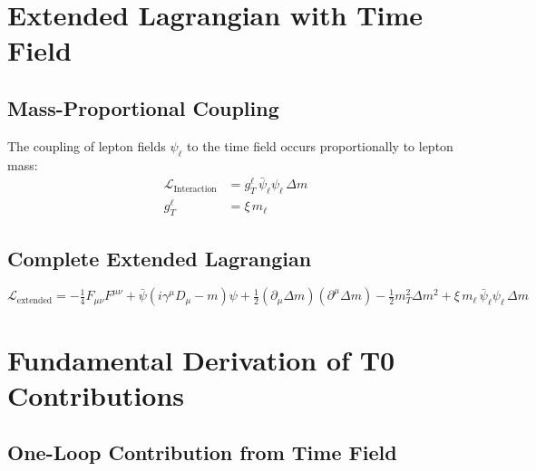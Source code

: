 \documentclass[12pt,a4paper]{article}
\begin{document}
	\section{Extended Lagrangian with Time Field}
	
	\subsection{Mass-Proportional Coupling}
	
	The coupling of lepton fields $\psi_\ell$ to the time field occurs proportionally to lepton mass:
	\begin{align}
		\mathcal{L}_{\mathrm{Interaction}} &= g_T^\ell \, \bar{\psi}_\ell \psi_\ell \, \Delta m \label{eq:interaction_lagrangian}\\
		g_T^\ell &= \xi \, m_\ell \label{eq:coupling_strength}
	\end{align}
	
	\subsection{Complete Extended Lagrangian}
	
	\begin{keyresult}
		\begin{equation}
			\mathcal{L}_{\mathrm{extended}} = -\tfrac{1}{4} F_{\mu\nu}F^{\mu\nu} + \bar{\psi}(i\gamma^\mu D_\mu - m)\psi + \tfrac{1}{2}(\partial_\mu \Delta m)(\partial^\mu \Delta m) - \tfrac{1}{2} m_T^2 \Delta m^2 + \xi \, m_\ell \,\bar{\psi}_\ell \psi_\ell \, \Delta m
			\label{eq:extended_lagrangian}
		\end{equation}
	\end{keyresult}
	
	\section{Fundamental Derivation of T0 Contributions}
	
	\subsection{One-Loop Contribution from Time Field}
	
\end{document}
